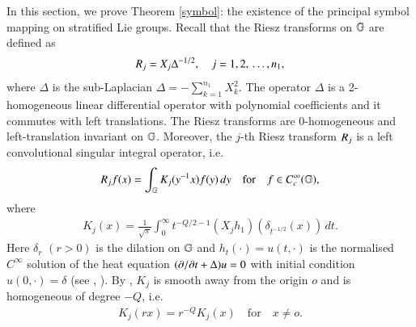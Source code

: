 \documentclass[leqno]{amsart}
\begin{document}
	In this section, we prove Theorem \ref{symbol}: the existence of the principal symbol mapping on stratified Lie groups.
	Recall that the Riesz transforms on $\mathbb{G}$ are defined as 
	$${ R}_{j}=X_{j}\Delta^{-1/2},\quad j=1,2,\,\dotsc,n_{1},$$ 
	where $\Delta$ is the sub-Laplacian $\displaystyle{\Delta=-\sum_{k=1}^{n_{1}}X_{k}^{2}}.$
	The operator $\Delta$ is a 2-homogeneous linear differential operator with polynomial coefficients and it commutes with left translations. 
	The Riesz transforms are 0-homogeneous and left-translation invariant on $\mathbb{G}$. 
	Moreover, the $j$-th Riesz transform ${ R}_{j}$ is a left convolutional singular integral operator, i.e.
	\begin{align}\label{Riesz-convolution}
		{ R}_{j}f(x)=\int_{\mathbb{G}}K_{j}(y^{-1} x)f(y)\,dy\quad{\rm for}\quad f\in C_{c}^{\infty}(\mathbb{G}),
	\end{align}
	where
	\begin{align*}
		K_{j}(x)=\frac{1}{\sqrt{\pi}}\int_{0}^{\infty}t^{-Q/2-1}(X_{j}h_{1})(\delta_{t^{-1/2}} (x))\,dt.
	\end{align*} 
	Here $\delta_{r}$ $(r>0)$ is the dilation on $\mathbb{G}$ and $h_{t}(\cdot)=u(t,\cdot)$ is the normalised $C^{\infty}$ solution of the heat equation $(\partial/\partial t+\Delta)u=0$ with initial condition $u(0,\cdot)=\delta$ (see  \cite[chapter 1]{FS1982}, \cite[IV.4]{VSC1992}). 
	By \cite{FS1982}, $K_{j}$ is smooth away from the origin $o$ and is homogeneous of degree $-Q$, i.e.
	\begin{align}\label{Riesz-homogeneous}
		K_{j}(rx)=r^{-Q}K_{j}(x) \quad \mbox{for} \quad x\neq o.
	\end{align}
	
\end{document}
